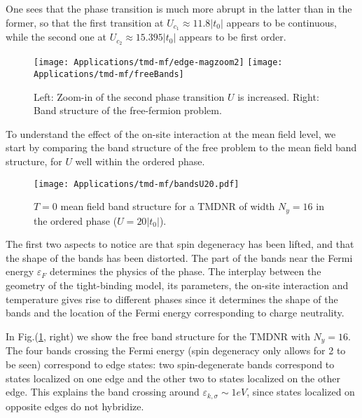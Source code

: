 One sees that the phase transition is much more abrupt in the latter than in the former, so that the first transition at $U_{c_1} \approx 11.8 |t_0|$ appears to be continuous, while the second one at $U_{c_2} \approx 15.395 |t_0|$ appears to be first order.
\begin{figure}[H]
\hspace{0.3cm}
\texttt{[image: Applications/tmd-mf/edge-magzoom2]}
\hspace{0.5cm}
\texttt{[image: Applications/tmd-mf/freeBands]}
	\caption[Zoom-in of the second phase transition (as $U$ is increased). Band structure of the free-fermion problem.]{Left: Zoom-in of the second phase transition $U$ is increased. Right: Band structure of the free-fermion problem.
	\label{fig:freeBands}}
\end{figure}
To understand the effect of the on-site interaction at the mean field level, we start by comparing the band structure of the free problem to the mean field band structure, for $U$ well within the ordered phase.
\begin{figure}[H]
\centering
\texttt{[image: Applications/tmd-mf/bandsU20.pdf]}
	\caption[$T=0$ mean field band structure for a \ac{TMDNR} of width $N_y = 16$ in the ordered phase, at $U=20 | t_0 |$.]{$T=0$ mean field band structure for a \ac{TMDNR} of width $N_y = 16$ in the ordered phase ($U=20 | t_0 |$).}
	\label{fig:bandsZoomed}
\end{figure}

The first two aspects to notice are that spin degeneracy has been lifted, and that the shape of the bands has been distorted.
The part of the bands near the Fermi energy $\varepsilon_F$ determines the physics of the phase.
The interplay between the geometry of the tight-binding model, its parameters, the on-site interaction and temperature gives rise to different phases since it determines the shape of the bands and the location of the Fermi energy corresponding to charge neutrality.

In Fig.(\ref{fig:freeBands}, right) we show the free band structure for the TMDNR with $N_y = 16$.
The four bands crossing the Fermi energy (spin degeneracy only allows for 2 to be seen) correspond to edge states: two spin-degenerate bands correspond to states localized on one edge and the other two to states localized on the other edge.
This explains the band crossing around $\varepsilon_{k, \sigma} \sim 1 eV$, since states localized on opposite edges do not hybridize.


